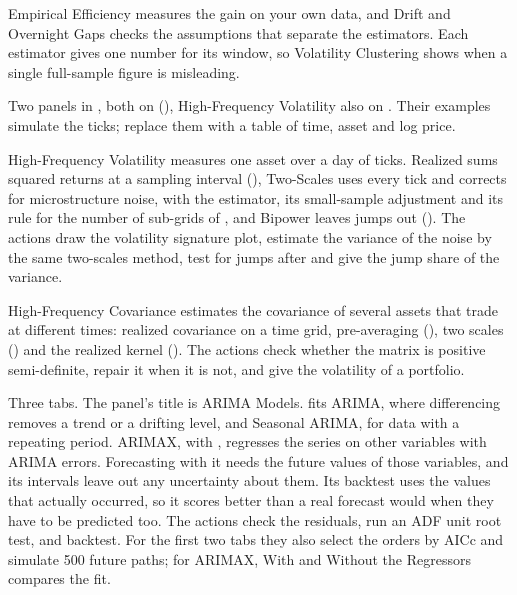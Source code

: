 \medskip
Empirical Efficiency measures the gain on your own data, and Drift and Overnight Gaps checks the assumptions that separate the estimators. Each estimator gives one number for its window, so Volatility Clustering shows when a single full-sample figure is misleading.

Two panels in , both on  (), High-Frequency Volatility also on . Their examples simulate the ticks; replace them with a table of time, asset and log price.

High-Frequency Volatility measures one asset over a day of ticks. Realized sums squared returns at a sampling interval (), Two-Scales uses every tick and corrects for microstructure noise, with the estimator, its small-sample adjustment and its rule for the number of sub-grids of , and Bipower leaves jumps out (). The actions draw the volatility signature plot, estimate the variance of the noise by the same two-scales method, test for jumps after  and give the jump share of the variance.

High-Frequency Covariance estimates the covariance of several assets that trade at different times: realized covariance on a time grid, pre-averaging (), two scales () and the realized kernel (). The actions check whether the matrix is positive semi-definite, repair it when it is not, and give the volatility of a portfolio.

Three tabs. The panel's title is ARIMA Models.  fits ARIMA, where differencing removes a trend or a drifting level, and Seasonal ARIMA, for data with a repeating period. ARIMAX, with , regresses the series on other variables with ARIMA errors. Forecasting with it needs the future values of those variables, and its intervals leave out any uncertainty about them. Its backtest uses the values that actually occurred, so it scores better than a real forecast would when they have to be predicted too. The actions check the residuals, run an ADF unit root test, and backtest. For the first two tabs they also select the orders by AICc and simulate 500 future paths; for ARIMAX, With and Without the Regressors compares the fit.

